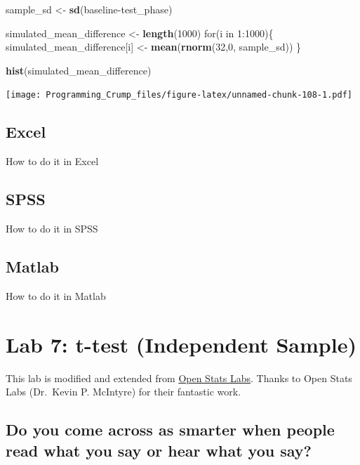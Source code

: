 \documentclass[]{book}
\newenvironment{Shaded}{\begin{snugshade}}{\end{snugshade}}
\newcommand{\KeywordTok}[1]{\textcolor[rgb]{0.13,0.29,0.53}{\textbf{{#1}}}}
\newcommand{\DecValTok}[1]{\textcolor[rgb]{0.00,0.00,0.81}{{#1}}}
\newcommand{\StringTok}[1]{\textcolor[rgb]{0.31,0.60,0.02}{{#1}}}
\newcommand{\NormalTok}[1]{{#1}}
\theoremstyle{definition}
\theoremstyle{definition}
\theoremstyle{definition}
\theoremstyle{remark}
\begin{document}
\begin{Shaded}
\begin{Highlighting}[]
\NormalTok{sample_sd   <-}\StringTok{ }\KeywordTok{sd}\NormalTok{(baseline-test_phase)}

\NormalTok{simulated_mean_difference <-}\StringTok{ }\KeywordTok{length}\NormalTok{(}\DecValTok{1000}\NormalTok{)}
\NormalTok{for(i in }\DecValTok{1}\NormalTok{:}\DecValTok{1000}\NormalTok{)\{}
 \NormalTok{simulated_mean_difference[i] <-}\StringTok{ }\KeywordTok{mean}\NormalTok{(}\KeywordTok{rnorm}\NormalTok{(}\DecValTok{32}\NormalTok{,}\DecValTok{0}\NormalTok{, sample_sd))}
\NormalTok{\}}

\KeywordTok{hist}\NormalTok{(simulated_mean_difference)}
\end{Highlighting}
\end{Shaded}

\texttt{[image: Programming\_Crump\_files/figure-latex/unnamed-chunk-108-1.pdf]}

\section{Excel}\label{excel-5}

How to do it in Excel

\section{SPSS}\label{spss-5}

How to do it in SPSS

\section{Matlab}\label{matlab-5}

How to do it in Matlab

\chapter{Lab 7: t-test (Independent
Sample)}\label{lab-7-t-test-independent-sample}

This lab is modified and extended from
\href{https://sites.trinity.edu/osl}{Open Stats Labs}. Thanks to Open
Stats Labs (Dr.~Kevin P. McIntyre) for their fantastic work.

\section{Do you come across as smarter when people read what you say or
hear what you
say?}\label{do-you-come-across-as-smarter-when-people-read-what-you-say-or-hear-what-you-say}
\end{document}
